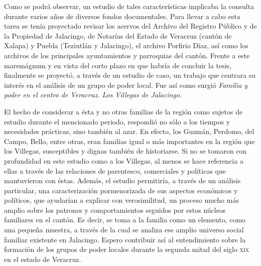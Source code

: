 \documentclass[14pt,twoside,final]{extbook} %
\begin{document}
Como se podrá observar, un estudio de tales características implicaba la consulta durante varios años de diversos fondos documentales. Para llevar a cabo esta tarea se tenía proyectado revisar los acervos del Archivo del Registro Público y de la Propiedad de Jalacingo, de Notarías del Estado de Veracruz (cantón de Xalapa) y Puebla (Teziutlán y Jalacingo), el archivo Porfirio Díaz, así como los archivos de los principales ayuntamientos y parroquias del cantón. Frente a este maremágnum y en vista del corto plazo en que habría de concluir la tesis, finalmente se proyectó, a través de un estudio de caso, un trabajo que centrara su interés en el análisis de un grupo de poder local. Fue así como surgió \emph{Familia y poder en el centro de Veracruz. Los Villegas de Jalacingo.}

El hecho de considerar a ésta y no otras familias de la región como sujetos de estudio durante el mencionado periodo, respondió no sólo a los tiempos y necesidades prácticas, sino también al azar. En efecto, los Guzmán, Perdomo, del Campo, Bello, entre otras, eran familias igual o más importantes en la región que los Villegas, susceptibles y dignas también de historiarse. Si no se tomaron con profundidad en este estudio como a los Villegas, al menos se hace referencia a ellas a través de las relaciones de parentesco, comerciales y políticas que mantuvieron con éstas. Además, el estudio permitiría, a través de un análisis particular, una caracterización pormenorizada de sus aspectos económicos y políticos, que ayudarían a explicar con verosimilitud, un proceso mucho más amplio sobre los patrones y comportamientos seguidos por estos núcleos familiares en el cantón. Es decir, se toma a la familia como un elemento, como una pequeña muestra, a través de la cual se analiza ese amplio universo social familiar existente en Jalacingo. Espero contribuir así al entendimiento sobre la formación de los grupos de poder locales durante la segunda mitad del siglo \textsc{xix} en el estado de Veracruz.
\end{document}
